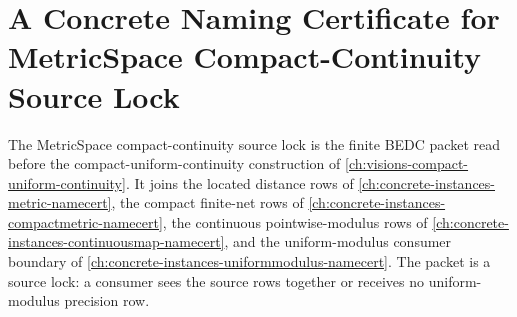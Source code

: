 \chapter{A Concrete Naming Certificate for MetricSpace Compact-Continuity Source Lock}
\label{ch:concrete-instances-metricspace-compact-continuity-source-lock-namecert}

The MetricSpace compact-continuity source lock is the finite BEDC packet read before the compact-uniform-continuity construction of \autoref{ch:visions-compact-uniform-continuity}. It joins the located distance rows of \autoref{ch:concrete-instances-metric-namecert}, the compact finite-net rows of \autoref{ch:concrete-instances-compactmetric-namecert}, the continuous pointwise-modulus rows of \autoref{ch:concrete-instances-continuousmap-namecert}, and the uniform-modulus consumer boundary of \autoref{ch:concrete-instances-uniformmodulus-namecert}. The packet is a source lock: a consumer sees the source rows together or receives no uniform-modulus precision row.



